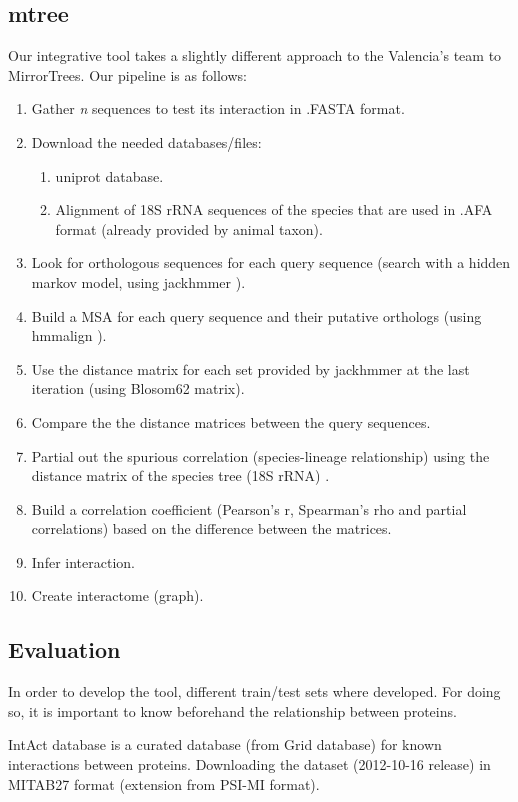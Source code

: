 \documentclass[11pt]{article}
\begin{document}
\subsection{mtree}
Our integrative tool takes a slightly different approach to the Valencia's team to MirrorTrees. Our pipeline is as follows:
\begin{enumerate}
\setlength{\itemsep}{1pt}
	\item Gather \textit{n} sequences to test its interaction in .FASTA format.
	\item Download the needed databases/files:
	\begin{enumerate}
	\setlength{\itemsep}{1pt}
		\item uniprot database.
		\item Alignment of 18S rRNA sequences of the species that are used in .AFA format (already provided by animal taxon).
	\end{enumerate}
	\item Look for orthologous sequences for each query sequence (search with a hidden markov model, using jackhmmer \cite{HMMER}).
	\item Build a MSA for each query sequence and their putative orthologs (using hmmalign \cite{HMMER}).
	\item Use the distance matrix for each set provided by jackhmmer at the last iteration \cite{HMMER} (using Blosom62 matrix).
	\item Compare the the distance matrices between the query sequences.
	\item Partial out the spurious correlation (species-lineage relationship) using the distance matrix of the species tree (18S rRNA) \cite{Sato2005}.	
	\item Build a correlation coefficient (Pearson's r, Spearman's rho and partial correlations) based on the difference between the matrices.
	\item Infer interaction.
	\item Create interactome (graph).
\end{enumerate}

\subsection{Evaluation}
In order to develop the tool, different train/test sets where developed. For doing so, it is important to know beforehand the relationship between proteins.

IntAct database\cite{intact} is a curated database (from Grid database) for known interactions between proteins. Downloading the dataset (2012-10-16 release) in MITAB27 format (extension from PSI-MI format).
\end{document}
